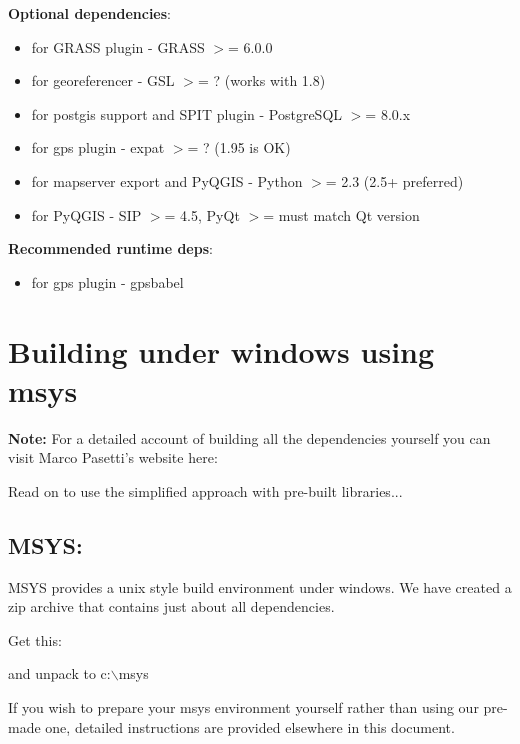 \textbf{Optional dependencies}:

\begin{itemize}
\item for GRASS plugin - GRASS $>$= 6.0.0
\item for georeferencer - GSL $>$= ? (works with 1.8)
\item for postgis support and SPIT plugin - PostgreSQL $>$= 8.0.x
\item for gps plugin - expat $>$= ? (1.95 is OK)
\item for mapserver export and PyQGIS - Python $>$= 2.3 (2.5+ preferred)
\item for PyQGIS - SIP $>$= 4.5, PyQt $>$= must match Qt version
\end{itemize}

\textbf{Recommended runtime deps}:

\begin{itemize}
\item for gps plugin - gpsbabel
\end{itemize}

\section{Building under windows using msys}
\textbf{Note:} For a detailed account of building all the dependencies yourself you 
can visit Marco Pasetti's website here:


Read on to use the simplified approach with pre-built libraries...

\subsection{MSYS:}
MSYS provides a unix style build environment under windows. We have created a
zip archive that contains just about all dependencies.

Get this: 


and unpack to c:$\backslash$msys

If you wish to prepare your msys environment yourself rather than using 
our pre-made one, detailed instructions are provided elsewhere in this
document.

